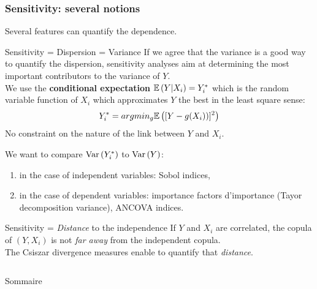 \documentclass[8pt]{beamer}
\begin{document}
\begin{frame}
\frametitle{Sensitivity: several notions}
\small

Several features can quantify the dependence.

\begin{block}{Sensitivity = Dispersion = Variance}
If we agree that  the \alert{variance is a good way to quantify the dispersion}, sensitivity analyses aim at determining the most important contributors to the variance of $Y$. \\
We use the {\bf conditional expectation}  $\mathbb{E}\left( Y|X_i \right) = Y^*_i$ which is the random variable function of $X_i$ which approximates $Y$ the best  in the least square sense: 
\begin{align*}
Y^*_i = argmin_{g} \mathbb{E}\left( [Y-g(X_i))]^2 \right)
\end{align*}
No constraint on the nature of the link between $Y$ and $X_i$.\\
\vspace*{0.1cm}

We want to compare  \alert{$\mbox{Var}\left( Y^*_i \right)$} to \alert{$\mbox{Var}\left( Y \right)$}:
 \begin{enumerate}
  \item in the case of independent variables: \alert{Sobol indices},
  \item in the case of dependent variables: importance factors d'importance (\alert{Tayor decomposition variance}), \alert{ANCOVA indices}.
 \end{enumerate}
\end{block}

\begin{block}{Sensitivity = \emph{Distance} to the independence}
 If $Y$ and $X_i$ are correlated, the  copula of $(Y,X_i)$ is not \emph{far away} from the independent copula.\\
 The \alert{Csiszar divergence measures} enable to quantify that \emph{distance}.
\end{block}

\end{frame}



\begin{frame}
  \begin{columns}

    {\huge{Sommaire}}
    \vspace{1cm}
    \small{\tableofcontents}
  \end{columns}
\end{frame}
\end{document}
